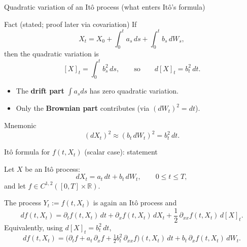 \documentclass[10pt,aspectratio=169]{beamer}
\newenvironment{theoremblock}[1]{%
  \begin{theorem}[#1]%
}{%
  \end{theorem}%
}
\newcommand{\R}{\mathbb{R}}
\begin{document}
\begin{frame}{Quadratic variation of an It\^o process (what enters It\^o's formula)}

\begin{block}{Fact (stated; proof later via covariation)}
If
\[
X_t=X_0+\int_0^t a_s\,ds+\int_0^t b_s\,dW_s,
\]
then the quadratic variation is
\[
[X]_t=\int_0^t b_s^2\,ds,
\qquad\text{so}\qquad
d[X]_t=b_t^2\,dt.
\]
\end{block}\pause

\begin{itemize}
  \item The \textbf{drift part} $\int a_s ds$ has zero quadratic variation.\pause
  \item Only the \textbf{Brownian part} contributes (via $(dW_t)^2=dt$).\pause
\end{itemize}

\medskip
\begin{alertblock}{Mnemonic}
\[
(dX_t)^2 \approx (b_t\,dW_t)^2 = b_t^2\,dt.
\]
\end{alertblock}

\end{frame}

\begin{frame}{It\^o formula for $f(t,X_t)$ (scalar case): statement}

Let $X$ be an It\^o process:
\[
dX_t = a_t\,dt + b_t\,dW_t,
\qquad 0\le t\le T,
\]
and let $f\in C^{1,2}([0,T]\times\R)$.\pause

\begin{theoremblock}{It\^o's formula (1D)}
The process $Y_t:=f(t,X_t)$ is again an It\^o process and
\[
df(t,X_t)
=
\partial_t f(t,X_t)\,dt
+
\partial_x f(t,X_t)\,dX_t
+
\frac12\,\partial_{xx} f(t,X_t)\,d[X]_t.
\]
Equivalently, using $d[X]_t=b_t^2\,dt$,
\[
df(t,X_t)
=
\Big(\partial_t f + a_t\,\partial_x f + \tfrac12 b_t^2\,\partial_{xx} f\Big)(t,X_t)\,dt
+
b_t\,\partial_x f(t,X_t)\,dW_t.
\]
\end{theoremblock}

\end{frame}
\end{document}
